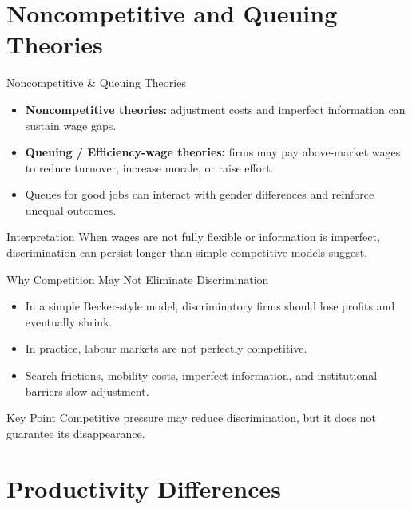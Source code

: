 \documentclass[aspectratio=169]{beamer}
\begin{document}
\section{Noncompetitive and Queuing Theories}

\begin{frame}{Noncompetitive \& Queuing Theories}
\transfade
\begin{itemize}[<+->]
  \item \textbf{Noncompetitive theories:} adjustment costs and imperfect information can sustain wage gaps.
  \item \textbf{Queuing / Efficiency-wage theories:} firms may pay above-market wages to reduce turnover, increase morale, or raise effort.
  \item Queues for good jobs can interact with gender differences and reinforce unequal outcomes.
\end{itemize}

\begin{block}{Interpretation}
When wages are not fully flexible or information is imperfect, discrimination can persist longer than simple competitive models suggest.
\end{block}
\end{frame}

\begin{frame}{Why Competition May Not Eliminate Discrimination}
\transfade
\begin{itemize}[<+->]
  \item In a simple Becker-style model, discriminatory firms should lose profits and eventually shrink.
  \item In practice, labour markets are not perfectly competitive.
  \item Search frictions, mobility costs, imperfect information, and institutional barriers slow adjustment.
\end{itemize}

\begin{block}{Key Point}
Competitive pressure may reduce discrimination, but it does not guarantee its disappearance.
\end{block}
\end{frame}

\section{Productivity Differences}
\end{document}
